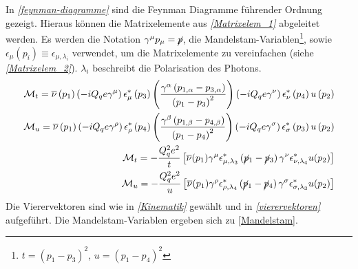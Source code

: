 In \textit{\autoref{feynman-diagramme}} sind die Feynman Diagramme führender Ordnung gezeigt. Hieraus können die Matrixelemente aus \textit{\autoref{Matrixelem_1}} abgeleitet werden. Es werden die Notation $\gamma^\mu p_\mu=\cancel{p}$, die Mandelstam-Variablen\footnote{$t = (p_1 - p_3)^2$, $u = (p_1 - p_4)^2$}, sowie $\epsilon_\mu(p_i) \equiv \epsilon_{\mu, \lambda_i}$ verwendet, um die Matrixelemente zu vereinfachen (siehe \textit{\autoref{Matrixelem_2}}). $\lambda_i$ beschreibt die Polarisation des Photons.
\begin{align}
\begin{split}
\label{Matrixelem_1}
\mathcal{M}_t = \overline{\nu}\left(p_1\right) \left(-iQ_qe\gamma^\mu\right) \epsilon^*_\mu\left(p_3\right) \left(\frac{\gamma^\alpha \left(p_{1,\alpha} - p_{3, \alpha}\right)}{\left(p_1 - p_3\right)^2}\right) \left(-iQ_qe\gamma^\nu\right) \epsilon^*_\nu\left(p_4\right) u\left( p_2\right) \\
\mathcal{M}_u = \overline{\nu}\left(p_1\right) \left(-iQ_qe\gamma^\rho\right) \epsilon^*_\rho\left(p_4\right) \left(\frac{\gamma^\beta \left(p_{1,\beta} - p_{4, \beta}\right)}{\left(p_1 - p_4\right)^2}\right) \left(-iQ_qe\gamma^\sigma\right) \epsilon^*_\sigma\left(p_3\right) u\left( p_2\right)
\end{split}
\\
\begin{split}
\mathcal{M}_t = -\frac{Q_q^2e^2}{t}\left[ \overline{\nu}(p_1) \gamma^\mu \epsilon^*_{\mu, \lambda_3} \left(\cancel{p}_1 - \cancel{p}_3\right) \gamma^\nu \epsilon^*_{\nu, \lambda_4} u(p_2)\right] \\
\mathcal{M}_u = -\frac{Q_q^2e^2}{u}\left[ \overline{\nu}(p_1) \gamma^\rho \epsilon^*_{\rho, \lambda_4} \left(\cancel{p}_1 - \cancel{p}_4\right) \gamma^\sigma \epsilon^*_{\sigma, \lambda_3} u(p_2)\right]
\label{Matrixelem_2}
\end{split}
\end{align}
Die Vierervektoren sind wie in \textit{\autoref{Kinematik}} gewählt und in \textit{\autoref{vierervektoren}} aufgeführt. Die Mandelstam-Variablen ergeben sich zu \textsf{\autoref{Mandelstam}}.
